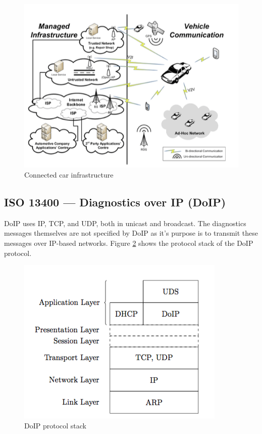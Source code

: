 \documentclass[11pt]{article}
\begin{document}
\begin{figure}[h]
	\caption{Connected car infrastructure}
	\label{fig:concar}
	\centering
	\includegraphics[width=\textwidth]{ConnectedCar}
\end{figure}

\subsection{ISO 13400 — Diagnostics over IP (DoIP)}

DoIP uses IP, TCP, and UDP, both in unicast and broadcast. The diagnostics messages themselves are not specified by DoIP as it's purpose is to transmit these messages over IP-based networks. Figure \ref{fig:doip} shows the protocol stack of the DoIP protocol. \cite{ISO13400}

\begin{figure}[h]
	\caption{DoIP protocol stack}
	\label{fig:doip}
	\centering
	\includegraphics[width=\textwidth]{DOIP}
\end{figure}
\end{document}
